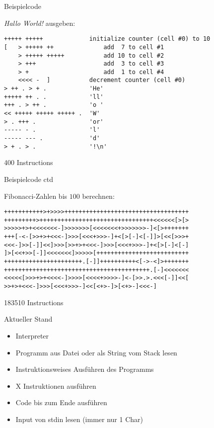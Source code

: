 \documentclass{beamer}
\begin{document}
\begin{frame}[fragile,c]{Beispielcode}

    \emph{Hallo World!} ausgeben:

    \begin{verbatim}
+++++ +++++             initialize counter (cell #0) to 10
[   > +++++ ++              add  7 to cell #1
    > +++++ +++++           add 10 to cell #2 
    > +++                   add  3 to cell #3
    > +                     add  1 to cell #4
    <<<< -  ]           decrement counter (cell #0)           
> ++ . > + .            'He'            
+++++ ++ . .            'll'
+++ . > ++ .            'o '
<< +++++ +++++ +++++ .  'W'
> . +++ .               'or'
----- - .               'l'
----- --- .             'd'
> + . > .               '!\n'
    \end{verbatim}

    400 Instructions

\end{frame}


\begin{frame}[fragile,c]{Beispielcode ctd}

    Fibonacci-Zahlen bis $100$ berechnen:

    \begin{verbatim}
+++++++++++>+>>>>+++++++++++++++++++++++++++++++++++
+++++++++>++++++++++++++++++++++++++++++++<<<<<<[>[>
>>>>>+>+<<<<<<<-]>>>>>>>[<<<<<<<+>>>>>>>-]<[>+++++++
+++[-<-[>>+>+<<<-]>>>[<<<+>>>-]+<[>[-]<[-]]>[<<[>>>+
<<<-]>>[-]]<<]>>>[>>+>+<<<-]>>>[<<<+>>>-]+<[>[-]<[-]
]>[<<+>>[-]]<<<<<<<]>>>>>[++++++++++++++++++++++++++
++++++++++++++++++++++.[-]]++++++++++<[->-<]>+++++++
+++++++++++++++++++++++++++++++++++++++++.[-]<<<<<<<
<<<<<[>>>+>+<<<<-]>>>>[<<<<+>>>>-]<-[>>.>.<<<[-]]<<[
>>+>+<<<-]>>>[<<<+>>>-]<<[<+>-]>[<+>-]<<<-]
    \end{verbatim}

    183510 Instructions

\end{frame}

\begin{frame}{Aktueller Stand}

    \begin{itemize}
        \item Interpreter
        \item Programm aus Datei oder als String vom Stack lesen
        \item Instruktionsweises Ausführen des Programms
        \item X Instruktionen ausführen
        \item Code bis zum Ende ausführen
        \item Input von stdin lesen (immer nur 1 Char)
    \end{itemize}

\end{frame}
\end{document}
